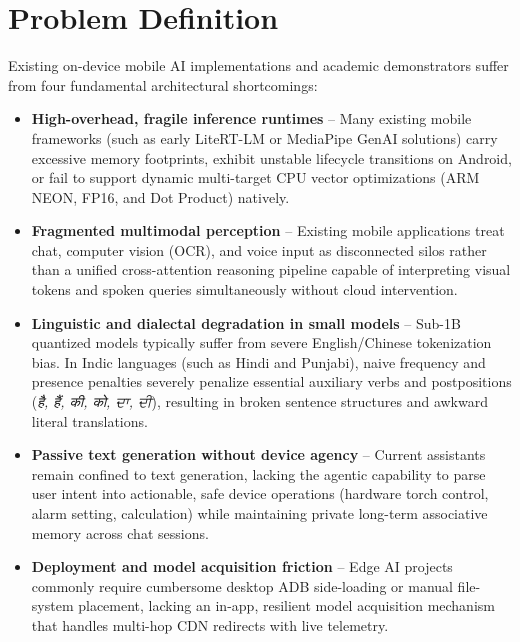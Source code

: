 \documentclass[11pt]{article}
\begin{document}
\section{Problem Definition}
Existing on-device mobile AI implementations and academic demonstrators suffer from four
fundamental architectural shortcomings:

\begin{itemize}[leftmargin=1.4em, itemsep=2pt]
    \item \textbf{High-overhead, fragile inference runtimes} -- Many existing mobile frameworks
    (such as early LiteRT-LM or MediaPipe GenAI solutions) carry excessive memory footprints,
    exhibit unstable lifecycle transitions on Android, or fail to support dynamic multi-target
    CPU vector optimizations (ARM NEON, FP16, and Dot Product) natively.
    \item \textbf{Fragmented multimodal perception} -- Existing mobile applications treat chat,
    computer vision (OCR), and voice input as disconnected silos rather than a unified
    cross-attention reasoning pipeline capable of interpreting visual tokens and spoken queries
    simultaneously without cloud intervention.
    \item \textbf{Linguistic and dialectal degradation in small models} -- Sub-1B quantized models
    typically suffer from severe English/Chinese tokenization bias. In Indic languages (such as
    Hindi and Punjabi), naive frequency and presence penalties severely penalize essential
    auxiliary verbs and postpositions (\textit{है, हैं, की, को, ਦਾ, ਦੀ}), resulting in broken
    sentence structures and awkward literal translations.
    \item \textbf{Passive text generation without device agency} -- Current assistants remain
    confined to text generation, lacking the agentic capability to parse user intent into
    actionable, safe device operations (hardware torch control, alarm setting, calculation)
    while maintaining private long-term associative memory across chat sessions.
    \item \textbf{Deployment and model acquisition friction} -- Edge AI projects commonly require
    cumbersome desktop ADB side-loading or manual file-system placement, lacking an in-app,
    resilient model acquisition mechanism that handles multi-hop CDN redirects with live telemetry.
\end{itemize}
\end{document}
